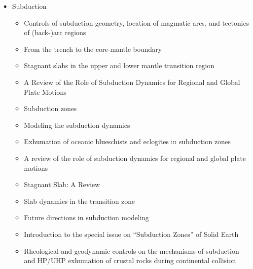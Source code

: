 

\begin{itemize}

\item Subduction
   \begin{itemize}
   \item [\nineteeneightytwo] Controls of subduction geometry, location of magmatic arcs, 
         and tectonics of (back-)arc regions \cite{crpi82}
   \item [\nineteenninetyfive] From the trench to the core-mantle boundary \cite{kinc95}
   \item [\twothousandone] Stagnant slabs in the upper and lower mantle transition region \cite{fuwo01}
   \item [\twothousandone] A Review of the Role of Subduction Dynamics for Regional and Global Plate Motions \cite{befa09}
   \item [\twothousandtwo] Subduction zones \cite{ster02}
   \item [\twothousandeight] Modeling the subduction dynamics \cite{bill08}
   \item [\twothousandnine] Exhumation of oceanic blueschists and eclogites in subduction zones \cite{agyj09}
   \item [\twothousandnine] A review of the role of subduction dynamics for regional and global plate motions \cite{befa09}
   \item [\twothousandnine] Stagnant Slab: A Review \cite{fuon09}
   \item [\twothousandten] Slab dynamics in the transition zone \cite{bill10}
   \item [\twothousandeleven] Future directions in subduction modeling \cite{gery11}
   \item [\twothousandthirteen] Introduction to the special issue on ``Subduction Zones'' of Solid Earth \cite{bufv13}
   \item [\twothousandfourteen] Rheological and geodynamic controls on the mechanisms of subduction and HP/UHP exhumation 
                of crustal rocks during continental collision \cite{bufa14,bufy14b}

\end{itemize}
\end{itemize}
